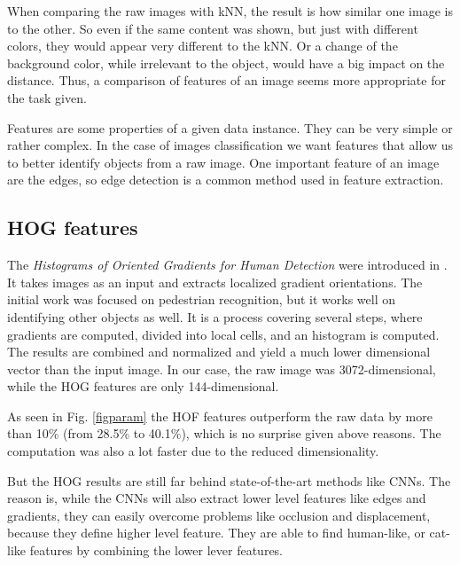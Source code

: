 When comparing the raw images with kNN, the result is how similar one image is to the other. So even if the same content was shown, but just with different colors, they would appear very different to the kNN. Or a change of the background color, while irrelevant to the object, would have a big impact on the distance. Thus, a comparison of features of an image seems more appropriate for the task given. 

Features are some properties of a given data instance. They can be very simple or rather complex. In the case of images classification we want features that allow us to better identify objects from a raw image. One important feature of an image are the edges, so edge detection is a common method used in feature extraction. 

\subsection{HOG features}
The \emph{Histograms of Oriented Gradients for Human Detection} were introduced in  \cite{Dalal:2005:HOG:1068507.1069007}. It takes images as an input and extracts localized gradient orientations. The initial work was focused on pedestrian recognition, but it works well on identifying other objects as well. It is a process covering several steps, where gradients are computed, divided into local cells, and an histogram is computed. The results are combined and normalized and yield a much lower dimensional vector than the input image. In our case, the raw image was 3072-dimensional, while the HOG features are only 144-dimensional. 

As seen in Fig. \ref{figparam} the HOF features outperform the raw data by more than 10\% (from 28.5\% to 40.1\%), which is no surprise given above reasons. The computation was also a lot faster due to the reduced dimensionality.

But the HOG results are still far behind state-of-the-art methods like CNNs. The reason is, while the CNNs will also extract lower level features like edges and gradients, they can easily overcome problems like occlusion and displacement, because they define higher level feature. They are able to find human-like, or cat-like features by combining the lower lever features. 


